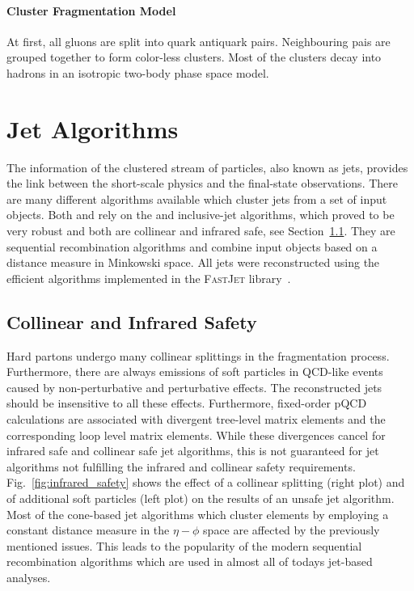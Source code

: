 \paragraph{Cluster Fragmentation Model}

At first, all gluons are split into quark antiquark pairs. Neighbouring pais are
grouped together to form color-less clusters. Most of the clusters decay into
hadrons in an isotropic two-body phase space model.

\section{Jet Algorithms}
\label{sec:jet_algorithms}

The information of the clustered stream of particles, also known as jets,
provides the link between the short-scale physics and the final-state
observations. There are many different algorithms available which cluster jets
from a set of input objects. Both \CMS and \ATLAS rely on the \antikt and
inclusive-\kt jet algorithms, which proved to be very robust and both are
collinear and infrared safe, see Section~\ref{sec:coll_safety}. They are
sequential recombination algorithms and combine input objects based on a
distance measure in Minkowski space. All jets were reconstructed using the
efficient algorithms implemented in the \textsc{FastJet} library~\cite{Cacciari:2011ma}.

\subsection{Collinear and Infrared Safety}
\label{sec:coll_safety}

Hard partons undergo many collinear splittings in the fragmentation process.
Furthermore, there are always emissions of soft particles in QCD-like events
caused by non-perturbative and perturbative effects. The reconstructed jets
should be insensitive to all these effects. Furthermore, fixed-order pQCD
calculations are associated with divergent tree-level matrix elements and the
corresponding loop level matrix elements. While these divergences cancel for
infrared safe and collinear safe jet algorithms, this is not guaranteed for jet
algorithms not fulfilling the infrared and collinear safety
requirements.
Fig.~\ref{fig:infrared_safety} shows the effect of a collinear splitting (right
plot) and of additional soft particles (left plot) on the results of an unsafe
jet algorithm. Most of the cone-based jet algorithms which cluster elements
by employing a constant distance measure in the $\eta-\phi$ space are affected by the
previously mentioned issues. This leads to the popularity of the modern sequential
recombination algorithms which are used in almost all of todays jet-based
analyses.

